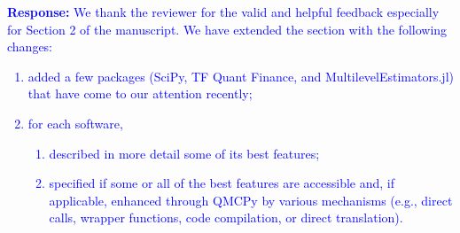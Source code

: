 \documentclass{amsart}
\newcommand{\scnote}[1]{ {\textcolor{blue}  {\mbox{\bf Response:} #1}}}
\begin{document}
%
%

\vspace{10ex}

\scnote{ 
We thank the reviewer for the valid and helpful feedback especially for Section 2 of the manuscript. We have extended the section with the following changes: 
\begin{enumerate}
 \item added a few packages (SciPy, TF Quant Finance, and MultilevelEstimators.jl) that have come to our attention recently; 
 \item for each software, 
    \begin{enumerate}
        \item described in more detail some of its best features;
        \item specified if some or all of the best features are accessible and, if applicable, enhanced through QMCPy by various mechanisms (e.g., direct calls, wrapper functions, code compilation, or direct translation).
    \end{enumerate}
\end{enumerate}
}
\end{document}
